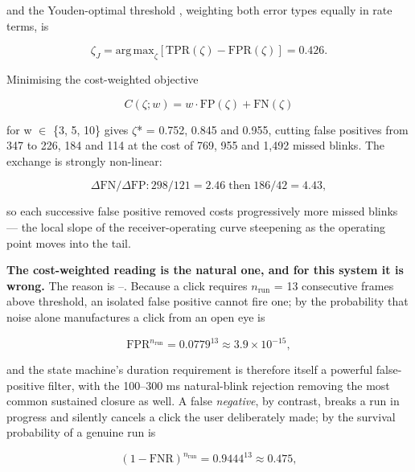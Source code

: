 and the Youden-optimal threshold , weighting both error types equally in rate terms, is

\begin{equation}
\label{eq:274}
\zeta _J = \mathrm{arg\,\mathrm{max}}_{\zeta} [ \mathrm{TPR}(\zeta ) - \mathrm{FPR}(\zeta ) ] = 0.426 .
\end{equation}

Minimising the cost-weighted objective

\begin{equation}
\label{eq:275}
C(\zeta ; w) = w \cdot \mathrm{FP}(\zeta ) + \mathrm{FN}(\zeta )
\end{equation}

for w $\in$ \{3, 5, 10\} gives $\zeta$* = 0.752, 0.845 and 0.955, cutting false positives from 347 to 226, 184 and 114 at the cost of 769, 955 and 1,492 missed blinks. The exchange is strongly non-linear:

\begin{equation}
\label{eq:276}
\Delta \mathrm{FN} / \Delta \mathrm{FP} : 298/121 = 2.46 \;\text{then}\; 186/42 = 4.43 ,
\end{equation}

so each successive false positive removed costs progressively more missed blinks --- the local slope of the receiver-operating curve steepening as the operating point moves into the tail.

\textbf{The cost-weighted reading is the natural one, and for this system it is wrong.} The reason is --. Because a click requires $n_{\mathrm{run}}$ = 13 consecutive frames above threshold, an isolated false positive cannot fire one; by  the probability that noise alone manufactures a click from an open eye is

\begin{equation}
\label{eq:277}
\mathrm{FPR}^{n_{\mathrm{run}}} = 0.0779^{13} \approx 3.9 \times 10^{-15} ,
\end{equation}

and the state machine's duration requirement is therefore itself a powerful false-positive filter, with the 100--300 ms natural-blink rejection removing the most common sustained closure as well. A false \emph{negative}, by contrast, breaks a run in progress and silently cancels a click the user deliberately made; by  the survival probability of a genuine run is

\begin{equation}
\label{eq:278}
( 1 - \mathrm{FNR} )^{n_{\mathrm{run}}} = 0.9444^{13} \approx 0.475 ,
\end{equation}

